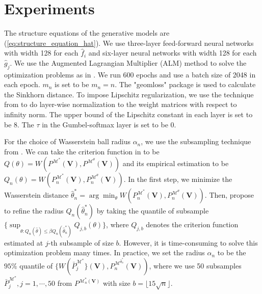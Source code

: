 \section{Experiments }\label{appendix:exp}

    The structure equations of the generative models are (\ref{eq:structure_equation_hat}). We use three-layer feed-forward neural networks with width 128 for each $\hat{f}_i$ and six-layer neural networks with width 128 for each $\hat{g}_j$. We use the Augmented Lagrangian Multiplier (ALM) method to solve the optimization problems as in \cite{balazadehPartialIdentificationTreatment2022}.  We run $600$ epochs and use a batch size of 2048 in each epoch. $m_n$ is set to be $ m_n = n $. The "geomloss" package \cite{feydy2019interpolating} is used to calculate the Sinkhorn distance. To impose Lipschitz regularization, we use the technique from \cite{gouk2021regularisation} to do layer-wise normalization to the weight matrices with respect to infinity norm. The upper bound of the Lipschitz constant in each layer is set to be $8$. The $\tau $ in the Gumbel-softmax layer is set to be $0$. 

For the choice of Wasserstein ball radius $\alpha_n$, we use the subsampling technique from \cite[Section 3.4]{chernozhukov2007estimation}. We can take the criterion function in \cite{chernozhukov2007estimation} to be $Q(\theta) = W(P^{\mathcal{M}^*}(\boldsymbol{V}),P^{\mathcal{M}^\theta}(\boldsymbol{V}))$ and its empirical estimation to be $Q_n(\theta) = W(P_n^{\mathcal{M}^*}(\boldsymbol{V}),P_n^{\mathcal{M}^\theta}(\boldsymbol{V}))$. In the first step, we minimize the Wasserstein distance $\hat{\theta}^*_n = \arg\min_{\theta}W(P^{\mathcal{M}^*}_{n}(\boldsymbol{V}),P^{\mathcal{M}^\theta}_{n}(\boldsymbol{V}))$. Then, \cite{chernozhukov2007estimation} propose to refine the radius $ Q_n(\hat{\theta}^*_n) $ by taking the quantile of subsample $ \{\sup_{\theta:Q_n(\hat{\theta})\leqslant \beta Q_n(\hat{\theta}^*_n)} Q_{j,b}(\theta)\} $, where $Q_{j,b}$ denotes the criterion function estimated at $j$-th subsample of size $b$. However, it is time-consuming to solve this optimization problem many times. In practice, we set the radius $\alpha_n$ to be the $95\%$ quantile of $\{W(\bar{P}_j^{\mathcal{M}^*}\}(\boldsymbol{V}),P^{\mathcal{M}^{\hat{\theta}^*_n}}_{n}(\boldsymbol{V}))$, where we use 50 subsamples $ \bar{P}_j^{\mathcal{M}^*},j=1,\cdots,50 $ from $P^{\mathcal{M}^*_{n}(\boldsymbol{V})}$ with size $b =\lfloor 15 \sqrt{n}\rfloor$. 





